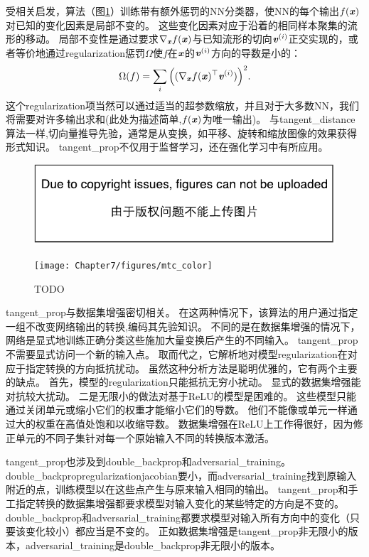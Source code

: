 受相关启发，算法\citep{Simard92-short}（图\ref{fig:chap7_mtc_color}）训练带有额外惩罚的\gls{NN}分类器，使\gls{NN}的每个输出$f(\boldsymbol{\mathit{x}})$对已知的变化因素是局部不变的。
这些变化因素对应于沿着的相同样本聚集的流形的移动。
局部不变性是通过要求$\nabla_{\boldsymbol{\mathit{x}}} f(\boldsymbol{\mathit{x}})$与已知流形的切向$\boldsymbol{\mathit{v}}^{(i)}$正交实现的，或者等价地通过\gls{regularization}惩罚$\Omega$使$f$在$\boldsymbol{\mathit{x}}$的$\boldsymbol{\mathit{v}}^{(i)}$方向的导数是小的：
\begin{align} \label{eq:767}
 \Omega(f) = \sum_i \Big((\nabla_{\boldsymbol{\mathit{x}}} f(\boldsymbol{\mathit{x}})^\top \boldsymbol{\mathit{v}}^{(i)}) \Big)^2 .
\end{align}
这个\gls{regularization}项当然可以通过适当的超参数缩放，并且对于大多数\gls{NN}，我们将需要对许多输出求和(此处为描述简单,$f(\boldsymbol{\mathit{x}})$为唯一输出)。
与\gls{tangent_distance}算法一样,切向量推导先验，通常是从变换，如平移、旋转和缩放图像的效果获得形式知识。
\gls{tangent_prop}不仅用于监督学习\citep{Simard92-short}，还在强化学习\citep{Thrun-NIPS1994}中有所应用。
\begin{figure}[!htb]
\ifOpenSource
\centerline{\includegraphics{figure.pdf}}
\else
\centerline{\texttt{[image: Chapter7/figures/mtc\_color]}}
\fi
\caption{TODO}
\label{fig:chap7_mtc_color}
\end{figure}

\gls{tangent_prop}与数据集增强密切相关。
在这两种情况下，该算法的用户通过指定一组不改变网络输出的转换,编码其先验知识。
不同的是在数据集增强的情况下，网络是显式地训练正确分类这些施加大量变换后产生的不同输入。
\gls{tangent_prop}不需要显式访问一个新的输入点。
取而代之，它解析地对模型\gls{regularization}在对应于指定转换的方向抵抗扰动。
虽然这种分析方法是聪明优雅的，它有两个主要的缺点。
首先，模型的\gls{regularization}只能抵抗无穷小扰动。
显式的数据集增强能对抗较大扰动。
二是无限小的做法对基于\gls{ReLU}的模型是困难的。
这些模型只能通过关闭单元或缩小它们的权重才能缩小它们的导数。
他们不能像或单元一样通过大的权重在高值处饱和以收缩导数。
数据集增强在\gls{ReLU}上工作得很好，因为修正单元的不同子集针对每一个原始输入不同的转换版本激活。


\gls{tangent_prop}也涉及到\gls{double_backprop}\citep{DruckerLeCun92}和\gls{adversarial_training}\citep{Szegedy-et-al-arxiv2014,Goodfellow-2015-adversarial}。
\gls{double_backprop}\gls{regularization}\gls{jacobian}要小，而\gls{adversarial_training}找到原输入附近的点，训练模型以在这些点产生与原来输入相同的输出。
\gls{tangent_prop}和手工指定转换的数据集增强都要求模型对输入变化的某些特定的方向是不变的。
\gls{double_backprop}和\gls{adversarial_training}都要求模型对输入所有方向中的变化（只要该变化较小）都应当是不变的。
正如数据集增强是\gls{tangent_prop}非无限小的版本，\gls{adversarial_training}是\gls{double_backprop}非无限小的版本。

